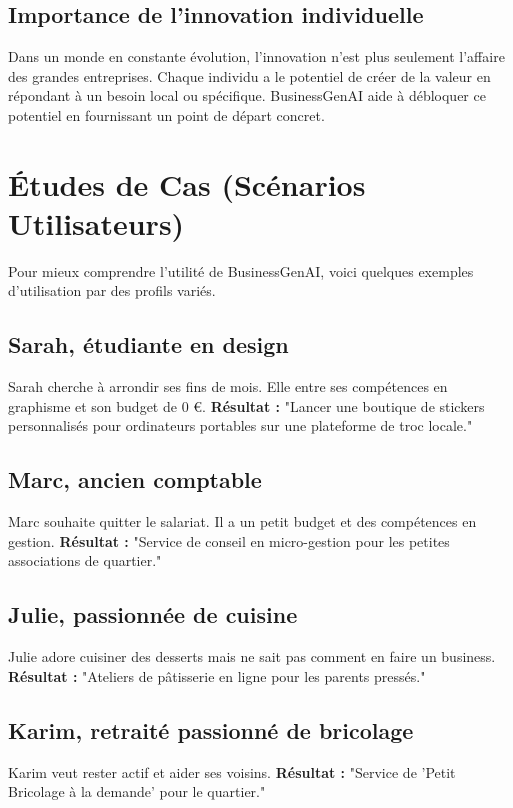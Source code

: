 \documentclass[12pt,a4paper]{report}
\begin{document}
\section{Importance de l'innovation individuelle}
Dans un monde en constante évolution, l'innovation n'est plus seulement l'affaire des grandes entreprises. Chaque individu a le potentiel de créer de la valeur en répondant à un besoin local ou spécifique. BusinessGenAI aide à débloquer ce potentiel en fournissant un point de départ concret.

\newpage

\chapter{Études de Cas (Scénarios Utilisateurs)}
Pour mieux comprendre l'utilité de BusinessGenAI, voici quelques exemples d'utilisation par des profils variés.

\section{Sarah, étudiante en design}
Sarah cherche à arrondir ses fins de mois. Elle entre ses compétences en graphisme et son budget de 0 €.
\textbf{Résultat :} "Lancer une boutique de stickers personnalisés pour ordinateurs portables sur une plateforme de troc locale."

\section{Marc, ancien comptable}
Marc souhaite quitter le salariat. Il a un petit budget et des compétences en gestion.
\textbf{Résultat :} "Service de conseil en micro-gestion pour les petites associations de quartier."

\section{Julie, passionnée de cuisine}
Julie adore cuisiner des desserts mais ne sait pas comment en faire un business.
\textbf{Résultat :} "Ateliers de pâtisserie en ligne pour les parents pressés."

\section{Karim, retraité passionné de bricolage}
Karim veut rester actif et aider ses voisins.
\textbf{Résultat :} "Service de 'Petit Bricolage à la demande' pour le quartier."
\end{document}
